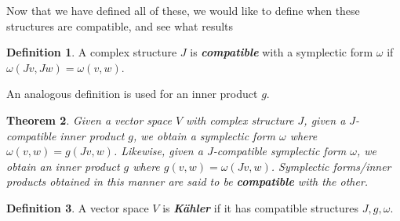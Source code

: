 \documentclass[psamsfonts]{amsart}
\newtheorem{thm}{Theorem}[section]
\theoremstyle{definition}
\newtheorem{defn}[thm]{Definition}
\theoremstyle{remark}
\newcommand{\ib}[1]{\textbf{\textit{#1}}}
\begin{document}
Now that we have defined all of these, we would like to define when these structures are compatible, and see what results
%
\begin{defn}
A complex structure $J$ is \ib{compatible} with a symplectic form $\omega$ if $\omega(Jv,Jw) = \omega(v,w)$.
\end{defn}
%
An analogous definition is used for an inner product $g$.
%
\begin{thm}
Given a vector space $V$ with complex structure $J$, given a $J$-compatible inner product $g$, we obtain a symplectic form $\omega$ where $\omega(v,w) = g(Jv,w)$. Likewise, given a $J$-compatible symplectic form $\omega$, we obtain an inner product $g$ where $g(v,w) = \omega(Jv,w)$. Symplectic forms/inner products obtained in this manner are said to be \ib{compatible} with the other.
\end{thm}
%
\begin{defn}
A vector space $V$ is \ib{K\"ahler} if it has compatible structures $J,g,\omega$.
\end{defn}
%
\end{document}
